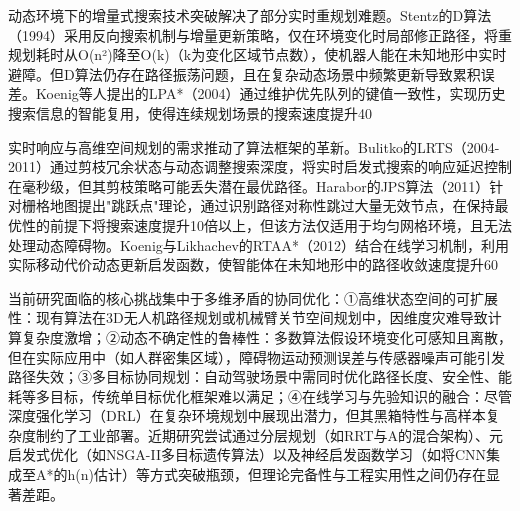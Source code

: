 \documentclass[master,academic]{ysuthesis} %
\begin{document}
		动态环境下的增量式搜索技术突破解决了部分实时重规划难题。Stentz的D算法（1994）采用反向搜索机制与增量更新策略，仅在环境变化时局部修正路径，将重规划耗时从O(n²)降至O(k)（k为变化区域节点数），使机器人能在未知地形中实时避障。但D算法仍存在路径振荡问题，且在复杂动态场景中频繁更新导致累积误差。Koenig等人提出的LPA*（2004）通过维护优先队列的键值一致性，实现历史搜索信息的智能复用，使得连续规划场景的搜索速度提升40%

		实时响应与高维空间规划的需求推动了算法框架的革新。Bulitko的LRTS（2004-2011）通过剪枝冗余状态与动态调整搜索深度，将实时启发式搜索的响应延迟控制在毫秒级，但其剪枝策略可能丢失潜在最优路径。Harabor的JPS算法（2011）针对栅格地图提出"跳跃点"理论，通过识别路径对称性跳过大量无效节点，在保持最优性的前提下将搜索速度提升10倍以上，但该方法仅适用于均匀网格环境，且无法处理动态障碍物。Koenig与Likhachev的RTAA*（2012）结合在线学习机制，利用实际移动代价动态更新启发函数，使智能体在未知地形中的路径收敛速度提升60%

		当前研究面临的核心挑战集中于多维矛盾的协同优化：① ​高维状态空间的可扩展性：现有算法在3D无人机路径规划或机械臂关节空间规划中，因维度灾难导致计算复杂度激增；② ​动态不确定性的鲁棒性：多数算法假设环境变化可感知且离散，但在实际应用中（如人群密集区域），障碍物运动预测误差与传感器噪声可能引发路径失效；③ ​多目标协同规划：自动驾驶场景中需同时优化路径长度、安全性、能耗等多目标，传统单目标优化框架难以满足；④ ​在线学习与先验知识的融合：尽管深度强化学习（DRL）在复杂环境规划中展现出潜力，但其黑箱特性与高样本复杂度制约了工业部署。近期研究尝试通过分层规划（如RRT与A的混合架构）、元启发式优化（如NSGA-II多目标遗传算法）以及神经启发函数学习（如将CNN集成至A*的h(n)估计）等方式突破瓶颈，但理论完备性与工程实用性之间仍存在显著差距。
\end{document}

